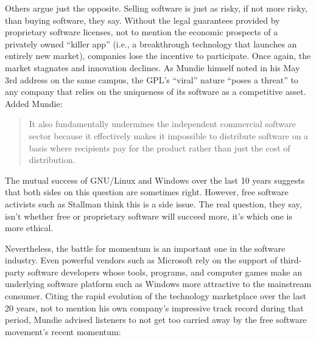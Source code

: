 Others argue just the opposite. Selling software is just as risky, if not more risky, than buying software, they say. Without the legal guarantees provided by proprietary software licenses, not to mention the economic prospects of a privately owned ``killer app'' (i.e., a breakthrough technology that launches an entirely new market), companies lose the incentive to participate. Once again, the market stagnates and innovation declines. As Mundie himself noted in his May 3rd address on the same campus, the GPL's ``viral'' nature ``poses a threat'' to any company that relies on the uniqueness of its software as a competitive asset. Added Mundie:

\begin{quote}
It also fundamentally undermines the independent commercial software sector because it effectively makes it impossible to distribute software on a basis where recipients pay for the product rather than just the cost of distribution.
\end{quote}

The mutual success of GNU/Linux and Windows over the last 10 years suggests that both sides on this question are sometimes right.  However, free software activists such as Stallman think this is a side issue.   The real question, they say, isn't whether free or proprietary software will succeed more, it's which one is more ethical.

Nevertheless, the battle for momentum is an important one in the software industry. Even powerful vendors such as Microsoft rely on the support of third-party software developers whose tools, programs, and computer games make an underlying software platform such as Windows more attractive to the mainstream consumer. Citing the rapid evolution of the technology marketplace over the last 20 years, not to mention his own company's impressive track record during that period, Mundie advised listeners to not get too carried away by the free software movement's recent momentum:

